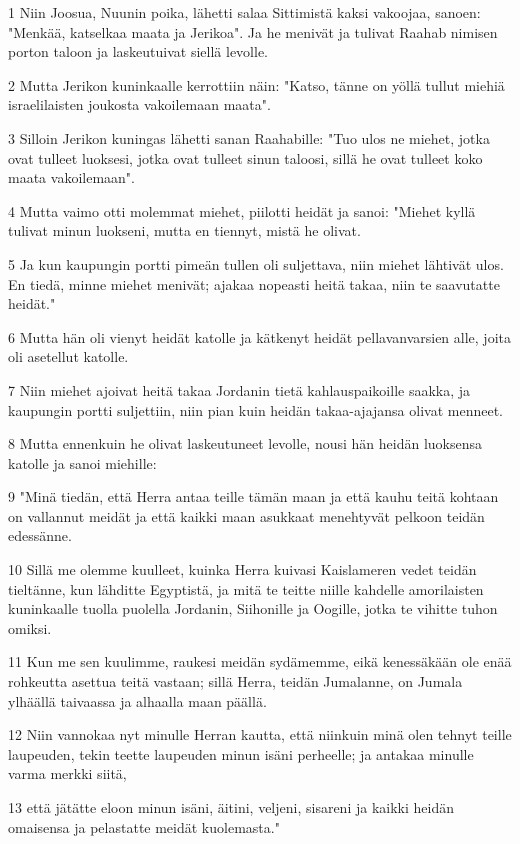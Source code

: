 \par 1 Niin Joosua, Nuunin poika, lähetti salaa Sittimistä kaksi vakoojaa, sanoen: "Menkää, katselkaa maata ja Jerikoa". Ja he menivät ja tulivat Raahab nimisen porton taloon ja laskeutuivat siellä levolle.
\par 2 Mutta Jerikon kuninkaalle kerrottiin näin: "Katso, tänne on yöllä tullut miehiä israelilaisten joukosta vakoilemaan maata".
\par 3 Silloin Jerikon kuningas lähetti sanan Raahabille: "Tuo ulos ne miehet, jotka ovat tulleet luoksesi, jotka ovat tulleet sinun taloosi, sillä he ovat tulleet koko maata vakoilemaan".
\par 4 Mutta vaimo otti molemmat miehet, piilotti heidät ja sanoi: "Miehet kyllä tulivat minun luokseni, mutta en tiennyt, mistä he olivat.
\par 5 Ja kun kaupungin portti pimeän tullen oli suljettava, niin miehet lähtivät ulos. En tiedä, minne miehet menivät; ajakaa nopeasti heitä takaa, niin te saavutatte heidät."
\par 6 Mutta hän oli vienyt heidät katolle ja kätkenyt heidät pellavanvarsien alle, joita oli asetellut katolle.
\par 7 Niin miehet ajoivat heitä takaa Jordanin tietä kahlauspaikoille saakka, ja kaupungin portti suljettiin, niin pian kuin heidän takaa-ajajansa olivat menneet.
\par 8 Mutta ennenkuin he olivat laskeutuneet levolle, nousi hän heidän luoksensa katolle ja sanoi miehille:
\par 9 "Minä tiedän, että Herra antaa teille tämän maan ja että kauhu teitä kohtaan on vallannut meidät ja että kaikki maan asukkaat menehtyvät pelkoon teidän edessänne.
\par 10 Sillä me olemme kuulleet, kuinka Herra kuivasi Kaislameren vedet teidän tieltänne, kun lähditte Egyptistä, ja mitä te teitte niille kahdelle amorilaisten kuninkaalle tuolla puolella Jordanin, Siihonille ja Oogille, jotka te vihitte tuhon omiksi.
\par 11 Kun me sen kuulimme, raukesi meidän sydämemme, eikä kenessäkään ole enää rohkeutta asettua teitä vastaan; sillä Herra, teidän Jumalanne, on Jumala ylhäällä taivaassa ja alhaalla maan päällä.
\par 12 Niin vannokaa nyt minulle Herran kautta, että niinkuin minä olen tehnyt teille laupeuden, tekin teette laupeuden minun isäni perheelle; ja antakaa minulle varma merkki siitä,
\par 13 että jätätte eloon minun isäni, äitini, veljeni, sisareni ja kaikki heidän omaisensa ja pelastatte meidät kuolemasta."
